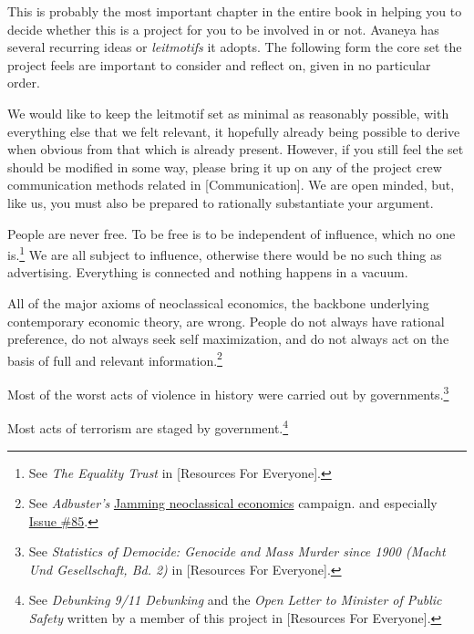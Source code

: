 

This is probably the most important chapter in the entire book in helping you to decide whether this is a project for you to be involved in or not. Avaneya has several recurring ideas or {\it leitmotifs} it adopts. The following form the core set the project feels are important to consider and reflect on, given in no particular order.

We would like to keep the leitmotif set as minimal as reasonably possible, with everything else that we felt relevant, it hopefully already being possible to derive when obvious from that which is already present. However, if you still feel the set should be modified in some way, please bring it up on any of the project crew communication methods related in [Communication]. We are open minded, but, like us, you must also be prepared to rationally substantiate your argument.

\startitemize[4]
\item
People are never free. To be free is to be independent of influence, which no one is.\footnote{See {\it The Equality Trust} in [Resources For Everyone].} We are all subject to influence, otherwise there would be no such thing as advertising. Everything is connected and nothing happens in a vacuum.

\item
All of the major axioms of neoclassical economics, the backbone underlying contemporary economic theory, are wrong. People do not always have rational preference, do not always seek self maximization, and do not always act on the basis of full and relevant information.\footnote{See {\it Adbuster's} \href{http://anticap.wordpress.com/2010/10/25/jamming-neoclassical-economics/}{Jamming neoclassical economics} campaign. and especially \href{http://www.adbusters.org/cultureshop/backissues/85}{Issue \#85}.}

\item
Most of the worst acts of violence in history were carried out by governments.\footnote{See {\it Statistics of Democide: Genocide and Mass Murder since 1900 (Macht Und Gesellschaft, Bd. 2)} in [Resources For Everyone].}

\item
Most acts of terrorism are staged by government.\footnote{See {\it Debunking 9/11 Debunking} and the {\it Open Letter to Minister of Public Safety} written by a member of this project in [Resources For Everyone].}

